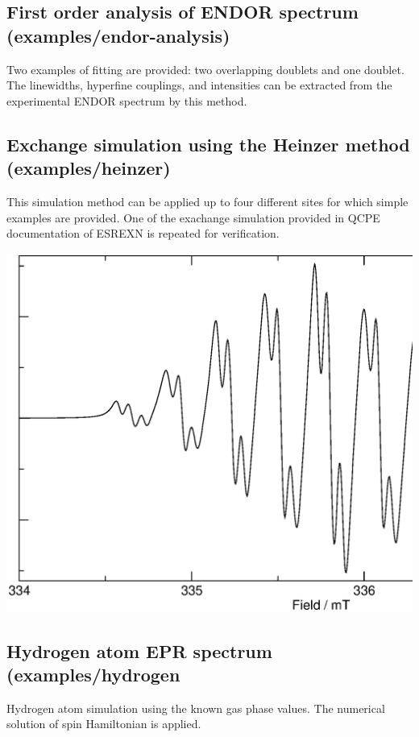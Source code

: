 \documentclass[byrevtex,amssymb,aps,pra,floatfix,letterpaper]{revtex4}
\begin{document}
\subsection{First order analysis of ENDOR spectrum (examples/endor-analysis)}

Two examples of fitting are provided: two overlapping doublets and one doublet. The linewidths, hyperfine couplings, and intensities can be extracted from the experimental ENDOR spectrum by this method.

\subsection{Exchange simulation using the Heinzer method (examples/heinzer)}

This simulation method can be applied up to four different sites for which simple examples are provided. One of the exachange simulation provided in QCPE documentation of ESREXN is repeated for verification.

\begin{center}
\includegraphics*[scale=0.25]{fig10}
\end{center}

\subsection{Hydrogen atom EPR spectrum (examples/hydrogen}

Hydrogen atom simulation using the known gas phase values. The numerical solution of spin Hamiltonian is applied.
\end{document}
